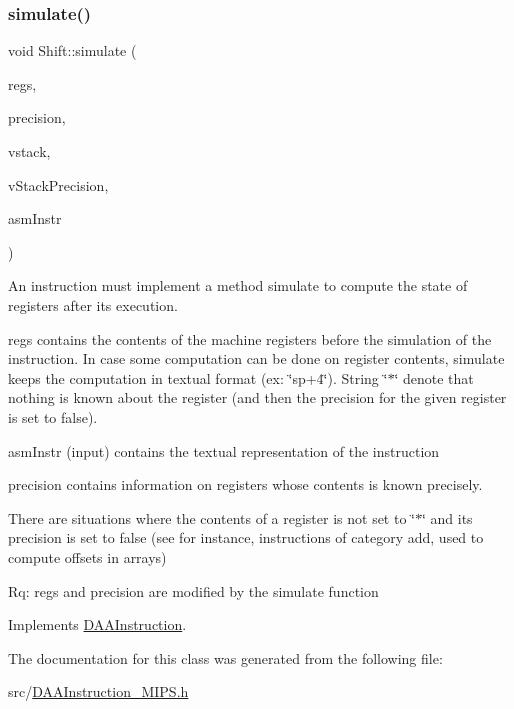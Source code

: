 \subsubsection{\texorpdfstring{simulate()}{simulate()}}
{\footnotesize\ttfamily void Shift\+::simulate (\begin{DoxyParamCaption}\item[{vector$<$ string $>$ \&}]{regs,  }\item[{vector$<$ bool $>$ \&}]{precision,  }\item[{\hyperlink{DAAInstruction_8h_a1b0e70ac1a04f06c8132055ed01f589f}{stack\+Type} \&}]{vstack,  }\item[{\hyperlink{DAAInstruction_8h_ac5cb793e9dac3fa9693da78b7e29ab30}{stack\+Prec\+Type} \&}]{v\+Stack\+Precision,  }\item[{const string \&}]{asm\+Instr }\end{DoxyParamCaption})\hspace{0.3cm}{\ttfamily [virtual]}}

An instruction must implement a method simulate to compute the state of registers after its execution.

regs contains the contents of the machine registers before the simulation of the instruction. In case some computation can be done on register contents, simulate keeps the computation in textual format (ex\+: \char`\"{}sp+4\char`\"{}). String \char`\"{}$\ast$\char`\"{} denote that nothing is known about the register (and then the precision for the given register is set to false).

asm\+Instr (input) contains the textual representation of the instruction

precision contains information on registers whose contents is known precisely.

There are situations where the contents of a register is not set to \char`\"{}$\ast$\char`\"{} and its precision is set to false (see for instance, instructions of category add, used to compute offsets in arrays)

Rq\+: regs and precision are modified by the simulate function 

Implements \hyperlink{classDAAInstruction_a61d0b9bece1e0ead89a46c0197276324}{D\+A\+A\+Instruction}.



The documentation for this class was generated from the following file\+:\begin{DoxyCompactItemize}
\item 
src/\hyperlink{DAAInstruction__MIPS_8h}{D\+A\+A\+Instruction\+\_\+\+M\+I\+P\+S.\+h}\end{DoxyCompactItemize}
